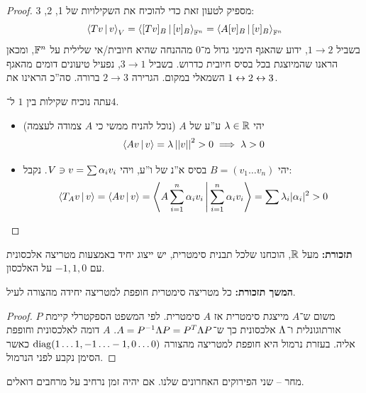 \documentclass[]{../../../../tex/classes/styledArticle}
\begin{document}
	\begin{proof}
		מספיק לטעון זאת כדי להוכיח את השקילויות של 1, 2, 3: 
		\[ \left \langle Tv \,\middle|\, v \right \rangle_V = \left \langle [Tv]_B \,\middle|\, [v]_B \right \rangle_{\mathbb{F}^n} = \left \langle A[v]_B \,\middle|\, [v]_B \right \rangle_{\mathbb{F}^n} \]
		בשביל $1 \to 2$, ידוע שהאגף הימני גדול מ־$0$ מההנחה שהיא חיובית/אי שלילית על $\mathbb{F}^n$, ומכאן הראנו שהמיוצגת בכל בסיס חיובית כדרוש. בשביל $3 \to 1$, נפעיל טיעונים דומים מהאגף השמאלי במקום. הגרירה $2 \to 3$ ברורה. סה''כ הראינו את $1\leftrightarrow2\leftrightarrow 3$. 
		
		עתה נוכיח שקילות בין $1$ ל־$4$. 
		\begin{itemize}
			\item[$1 \to 4$] יהי $\lambda \in \mathbb{R}$ ע''ע של $A$ (נוכל להניח ממשי כי $A$ צמודה לעצמה)
			\[ \left \langle Av \,\middle|\, v \right \rangle = \lambda\left \vert \left \vert v \right \vert \right \vert^2 > 0 \implies \lambda > 0 \]
			\item[$4 \to 1$] יהי $B = (v_1 \dots v_n)$ בסיס א''נ של ו''ע, ויהי $V \ni v = \sum \alpha_i v_i$. נקבל: 
			\[ \left \langle T_Av \,\middle|\, v \right \rangle = \left \langle Av \,\middle|\, v \right \rangle = \left \langle A\sum_{i = 1}^{n} \alpha_i v_i \,\middle|\, \sum_{i = 1}^{n} \alpha_i v_i \right \rangle = \sum \lambda_i |\alpha_i|^2 > 0 \]
		\end{itemize}
	\end{proof}
	
	\textbf{תזכורת: }מעל $\mathbb{R}$, הוכחנו שלכל תבנית סימטרית, יש ייצוג יחיד באמצעות מטריצה אלכסונית עם $-1, 1, 0$ על האלכסון. 
	
	\textbf{המשך תזכורת: }כל מטריצה סימטרית חופפת למטריצה יחידה מהצורה לעיל. 
	
	
	\begin{proof}
		משום ש־$A$ מייצגת סימטרית אז $A$ סימטרית. לפי המשפט הספקטרלי קיימת $P$ אורתוגונלית ו־$\Lambda$ אלכסונית כך ש־$A = P^{-1}\Lambda P = P^T\Lambda P$. $A$ דומה לאלכסונית וחופפת אליה. בעזרת נרמול היא חופפת למטריצה מהצורה $\operatorname{diag}(1 \dots 1, -1 \ldots -1, 0 \ldots 0)$ כאשר הסימן נקבע לפני הנרמול. 
	\end{proof}
	
	מחר – שני הפירוקים האחרונים שלנו. אם יהיה זמן נרחיב על מרחבים דואלים. 
	
	
	
	\ndoc
\end{document}
